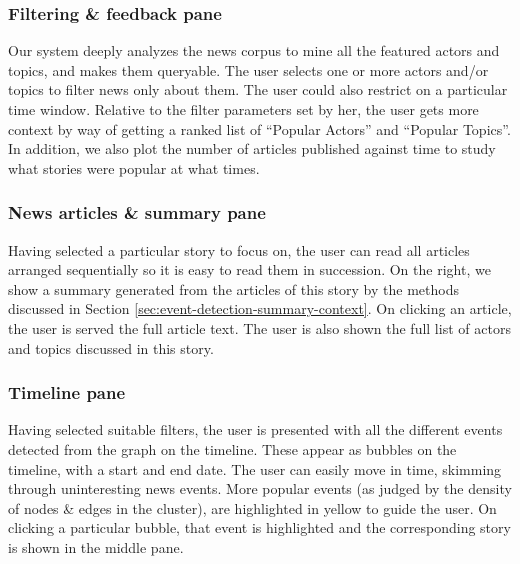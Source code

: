 \subsubsection*{Filtering \& feedback pane}
Our system deeply analyzes the news corpus to mine all the featured actors and topics, and makes them queryable. The user selects one or more actors
and/or topics to filter news only about them. The user could also restrict on a particular time window. Relative to the filter parameters set by her, 
the user gets more context by way of getting a ranked list of ``Popular Actors'' and ``Popular Topics''. In addition, we also plot the number of
articles published against time to study what stories were popular at what times. 
 
\subsubsection*{News articles \& summary pane}\label{sec:filter-summarization}
Having selected a particular story to focus on, the user can read all articles arranged sequentially so it is easy to read them in succession.
On the right, we show a summary generated from the articles of this story by the methods discussed in Section \ref{sec:event-detection-summary-context}.
On clicking an article, the user is served the full article text. The user is also shown the full list of actors and topics discussed in this story.
\subsubsection*{Timeline pane}
Having selected suitable filters, the user is presented with all the different events detected from the graph on the timeline. These appear as 
bubbles on the timeline, with a start and end date. The user can easily move in time, skimming through uninteresting news events.
More popular events (as judged by the density of nodes \& edges in the cluster), are highlighted in yellow to guide the user.
On clicking a particular bubble, that event is highlighted and the corresponding story is shown in the middle pane.
